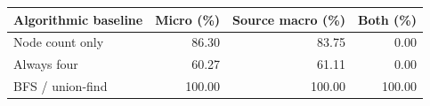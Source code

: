 \begin{tabular}{lrrr}
\toprule
Algorithmic baseline & Micro (\%) & Source macro (\%) & Both (\%) \\
\midrule
Node count only & 86.30 & 83.75 & 0.00 \\
Always four & 60.27 & 61.11 & 0.00 \\
BFS / union-find & 100.00 & 100.00 & 100.00 \\
\bottomrule
\end{tabular}
